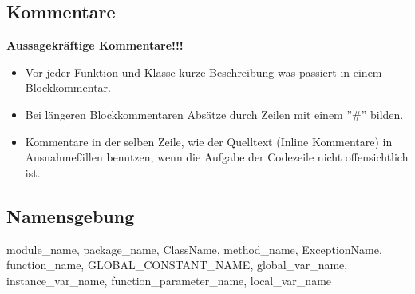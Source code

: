 \documentclass[11pt]{scrartcl}
\begin{document}
		\subsection{Kommentare}
			\textbf{Aussagekr\"aftige Kommentare!!!}
			\begin{itemize}
				\item[] Vor jeder Funktion und Klasse kurze Beschreibung was passiert in einem Blockkommentar.
				\item[] Bei l\"angeren Blockkommentaren Abs\"atze durch Zeilen mit einem ''\#'' bilden.
				\item[] Kommentare in der selben Zeile, wie der Quelltext (Inline Kommentare) in Ausnahmef\"allen benutzen, wenn die Aufgabe der Codezeile nicht offensichtlich ist.
			\end{itemize}
		\subsection{Namensgebung}
			module\_name, package\_name, ClassName, method\_name, 
			ExceptionName, function\_name, GLOBAL\_CONSTANT\_NAME, global\_var\_name, instance\_var\_name, function\_parameter\_name, local\_var\_name
\end{document}
